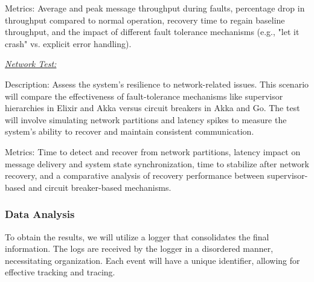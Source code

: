 Metrics: Average and peak message throughput during faults, percentage drop in throughput compared to normal operation, recovery time to regain baseline throughput, and the impact of different fault tolerance mechanisms (e.g., "let it crash" vs. explicit error handling).

\textit{\underline{Network Test:}}

Description: Assess the system's resilience to network-related issues. This scenario will compare the effectiveness of fault-tolerance mechanisms like supervisor hierarchies in Elixir and Akka versus circuit breakers in Akka and Go. The test will involve simulating network partitions and latency spikes to measure the system's ability to recover and maintain consistent communication.

Metrics: Time to detect and recover from network partitions, latency impact on message delivery and system state synchronization, time to stabilize after network recovery, and a comparative analysis of recovery performance between supervisor-based and circuit breaker-based mechanisms.

\subsubsection{Data Analysis}

To obtain the results, we will utilize a logger that consolidates the final information. The logs are received by the logger in a disordered manner, necessitating organization. Each event will have a unique identifier, allowing for effective tracking and tracing.
